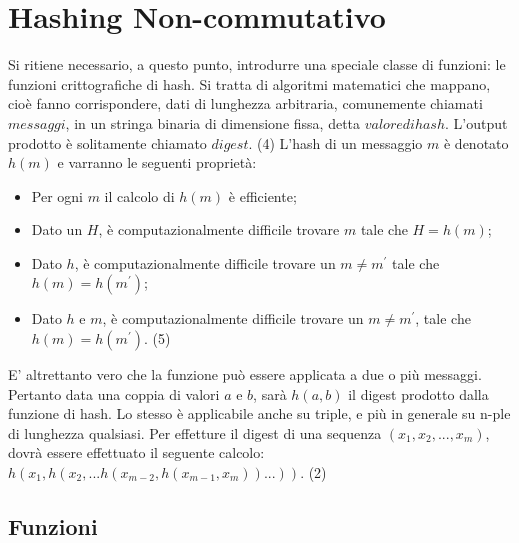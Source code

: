 	
\section{Hashing Non-commutativo}
	

	Si ritiene necessario, a questo punto, introdurre una speciale classe di funzioni: le funzioni crittografiche di hash. Si tratta di algoritmi matematici che mappano, cioè fanno corrispondere, dati di lunghezza arbitraria, comunemente chiamati $ messaggi $, in un stringa binaria di dimensione fissa, detta $ valore di hash $. L'output prodotto è solitamente chiamato $ digest $. (4)
	L'hash di un messaggio $ m $ è denotato $ h(m) $ e varranno le seguenti proprietà:
	
	\begin{itemize}
		\item Per ogni $ m $ il calcolo di $ h(m) $ è efficiente;
		\item Dato un $ H $, è computazionalmente difficile trovare $ m $ tale che $ H = h(m) $;
		\item Dato $ h $, è computazionalmente difficile trovare un $ m \ne m^{'}$ tale che $ h(m) = h(m^{'}) $;
		\item Dato $ h $ e $ m $, è computazionalmente difficile trovare un $ m \ne m^{'} $, tale che $ h(m) = h(m^{'}) $. (5)
	\end{itemize}

	E' altrettanto vero che la funzione può essere applicata a due o più messaggi. Pertanto data una coppia di valori $ a $ e $ b $, sarà $ h(a,b) $ il digest prodotto dalla funzione di hash. Lo stesso è applicabile anche su triple, e più in generale su n-ple di lunghezza qualsiasi. Per effetture il digest di una sequenza $ (x_{1}, x_{2}, ... , x_{m}) $, dovrà essere effettuato il seguente calcolo: $ h(x_{1}, h(x_{2}, ... h(x_{m-2},h(x_{m-1},x_{m}))...)) $. (2)
	
		\subsection{Funzioni}
	


